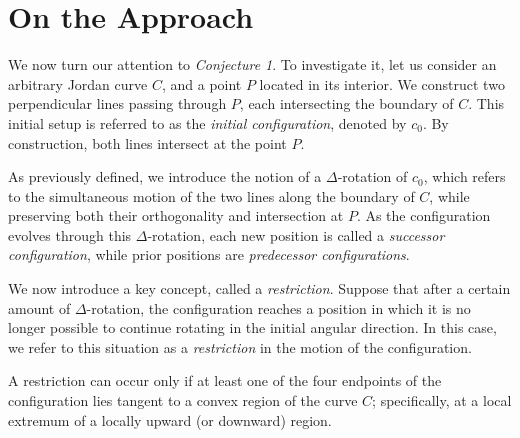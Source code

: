 \section{On the Approach}

We now turn our attention to \emph{Conjecture 1}. To investigate it, let us consider an arbitrary Jordan curve $C$, and a point $P$ located in its interior. We construct two perpendicular lines passing through $P$, each intersecting the boundary of $C$. This initial setup is referred to as the \emph{initial configuration}, denoted by $c_0$. By construction, both lines intersect at the point $P$.

As previously defined, we introduce the notion of a $\Delta$-rotation of $c_0$, which refers to the simultaneous motion of the two lines along the boundary of $C$, while preserving both their orthogonality and intersection at $P$. As the configuration evolves through this $\Delta$-rotation, each new position is called a \emph{successor configuration}, while prior positions are \emph{predecessor configurations}.

We now introduce a key concept, called a \emph{restriction}. Suppose that after a certain amount of $\Delta$-rotation, the configuration reaches a position in which it is no longer possible to continue rotating in the initial angular direction. In this case, we refer to this situation as a \emph{restriction} in the motion of the configuration.

\begin{proposition}
A restriction can occur only if at least one of the four endpoints of the configuration lies tangent to a convex region of the curve $C$; specifically, at a local extremum of a locally upward (or downward) region.
\end{proposition}

